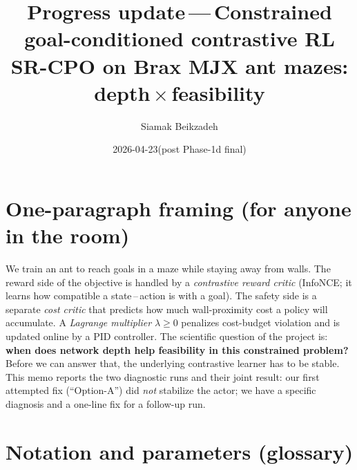 \documentclass[11pt]{article}
\title{\vspace{-2em}%
Progress update\,---\,Constrained goal-conditioned contrastive RL\\
\large SR-CPO on Brax MJX ant mazes: depth\,$\times$\,feasibility}
\author{Siamak Beikzadeh}
\date{2026-04-23\quad (post Phase-1d final)}
\begin{document}
\maketitle
\vspace{-1.5em}

\section{One-paragraph framing (for anyone in the room)}
\label{sec:framing}

We train an ant to reach goals in a maze while staying away from walls. The
reward side of the objective is handled by a \emph{contrastive reward
critic} (InfoNCE; it learns how compatible a state\,--\,action is with a goal).
The safety side is a separate \emph{cost critic} that predicts how much
wall-proximity cost a policy will accumulate. A \emph{Lagrange multiplier}
$\lambda\ge 0$ penalizes cost-budget violation and is updated online by a
PID controller. The scientific question of the project is: \textbf{when does
network depth help feasibility in this constrained problem?} Before we can
answer that, the underlying contrastive learner has to be stable. This memo
reports the two diagnostic runs and their joint result: our first attempted
fix (``Option-A'') did \emph{not} stabilize the actor; we have a specific
diagnosis and a one-line fix for a follow-up run.

\section{Notation and parameters (glossary)}
\label{sec:glossary}
\end{document}
